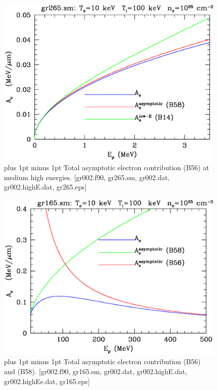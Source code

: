 \documentclass[preprint,12pt,eqsecnum,nofootinbib,amsmath,amssymb]{revtex4}
\newcommand{\footnoteskip}{\baselineskip 12pt plus 1pt minus 1pt}
\begin{document}
\pagebreak

\vskip-2cm 
\begin{figure}[h!]
\includegraphics[scale=0.45]{gr265.eps} 
\vskip-0.8cm 
\caption{\footnoteskip  
  Total asymptotic electron contribution (B56) at medium high
  energies. [gr002.f90, gr265.sm, gr002.dat, gr002.highE.dat, gr265.eps]
}
\label{fig:gr265}
\end{figure}

\vskip-2cm 
\begin{figure}[h!]
\includegraphics[scale=0.45]{gr165.eps} 
\vskip-0.8cm 
\caption{\footnoteskip  
  Total asymptotic electron contribution (B56) and (B58).  [gr002.f90,
  gr165.sm, gr002.dat, gr002.highE.dat, gr002.highEe.dat, gr165.eps]
}
\label{fig:gr165}
\end{figure}
\end{document}
